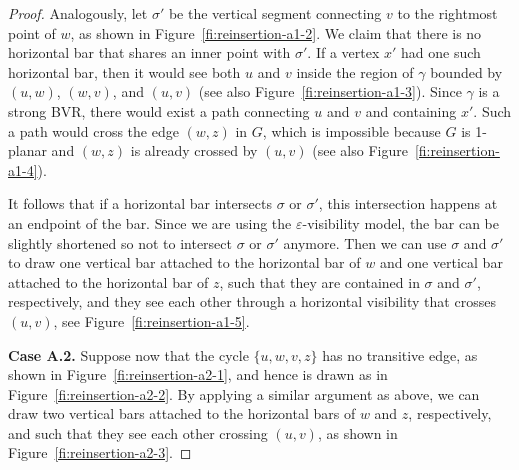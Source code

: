 \documentclass{article}
\begin{document}
\begin{proof}
Analogously, let $\sigma'$ be the vertical segment connecting $v$ to the rightmost point of $w$, as shown in Figure~\ref{fi:reinsertion-a1-2}. We claim that there is no horizontal bar that shares an inner point with $\sigma'$. If a vertex $x'$ had one such horizontal bar, then it would see both $u$ and $v$ inside the region of $\gamma$ bounded by $(u,w)$, $(w,v)$, and $(u,v)$ (see also Figure~\ref{fi:reinsertion-a1-3}). Since $\gamma$ is a strong BVR, there would exist a path connecting $u$ and $v$ and containing $x'$. Such a path would cross the edge $(w,z)$ in $G$, which is impossible because $G$ is 1-planar and $(w,z)$ is already crossed by $(u,v)$ (see also Figure~\ref{fi:reinsertion-a1-4}).

It follows that if a horizontal bar intersects $\sigma$ or $\sigma'$, this intersection happens at an endpoint of the bar. Since we are using the $\varepsilon$-visibility model, the bar can be slightly shortened so not to intersect $\sigma$ or $\sigma'$ anymore. Then we can use $\sigma$ and $\sigma'$  to draw one vertical bar attached to the horizontal bar of $w$ and one vertical bar attached to the horizontal bar of $z$, such that they are contained in $\sigma$ and $\sigma'$, respectively, and they see each other through a horizontal visibility that crosses $(u,v)$, see Figure~\ref{fi:reinsertion-a1-5}.



{\bf Case A.2.} Suppose now that the cycle $\{u,w,v,z\}$ has no transitive edge, as shown in Figure~\ref{fi:reinsertion-a2-1}, and hence is drawn as in Figure~\ref{fi:reinsertion-a2-2}. By applying a similar argument as above, we can draw two vertical bars attached to the horizontal bars of $w$ and $z$, respectively, and such that they see each other crossing $(u,v)$, as shown in Figure~\ref{fi:reinsertion-a2-3}.



\end{proof}
\end{document}
